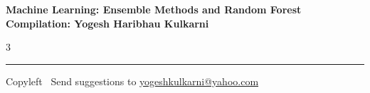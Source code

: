 \documentclass[8pt,landscape]{article}
\begin{document}
\footnotesize


\begin{center}
\Large{\textbf{Machine Learning: Ensemble Methods and Random Forest\\ Compilation: Yogesh Haribhau Kulkarni}}
\end{center}

\begin{multicols}{3}

\end{multicols}

\rule{\linewidth}{0.25pt}
\scriptsize
Copyleft \textcopyleft\  Send suggestions to
\href{http://www.yogeshkulkarni.com}{yogeshkulkarni@yahoo.com}
\end{document}
